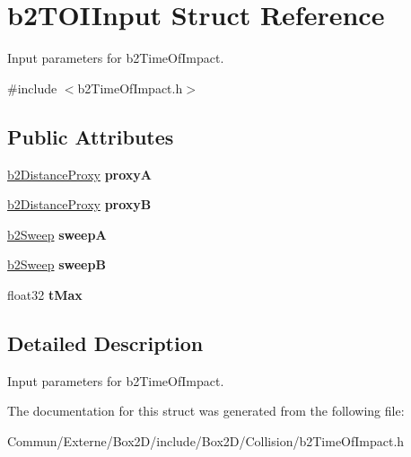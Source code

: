 \hypertarget{structb2_t_o_i_input}{}\section{b2\+T\+O\+I\+Input Struct Reference}
\label{structb2_t_o_i_input}


Input parameters for b2\+Time\+Of\+Impact.  




{\ttfamily \#include $<$b2\+Time\+Of\+Impact.\+h$>$}

\subsection*{Public Attributes}
\begin{DoxyCompactItemize}
\item 
\hyperlink{structb2_distance_proxy}{b2\+Distance\+Proxy} {\bfseries proxyA}\hypertarget{structb2_t_o_i_input_a5c5fb931435d92ac2d2080552400cd57}{}\label{structb2_t_o_i_input_a5c5fb931435d92ac2d2080552400cd57}

\item 
\hyperlink{structb2_distance_proxy}{b2\+Distance\+Proxy} {\bfseries proxyB}\hypertarget{structb2_t_o_i_input_a7f4e614d1c574006402e9610c984a93f}{}\label{structb2_t_o_i_input_a7f4e614d1c574006402e9610c984a93f}

\item 
\hyperlink{structb2_sweep}{b2\+Sweep} {\bfseries sweepA}\hypertarget{structb2_t_o_i_input_adf63a4b9969aa839c2d520bf6d76148a}{}\label{structb2_t_o_i_input_adf63a4b9969aa839c2d520bf6d76148a}

\item 
\hyperlink{structb2_sweep}{b2\+Sweep} {\bfseries sweepB}\hypertarget{structb2_t_o_i_input_af506b6adc7eca852f08460ec76c7b9a7}{}\label{structb2_t_o_i_input_af506b6adc7eca852f08460ec76c7b9a7}

\item 
float32 {\bfseries t\+Max}\hypertarget{structb2_t_o_i_input_a365a434996de60957777a673918d3a5f}{}\label{structb2_t_o_i_input_a365a434996de60957777a673918d3a5f}

\end{DoxyCompactItemize}


\subsection{Detailed Description}
Input parameters for b2\+Time\+Of\+Impact. 

The documentation for this struct was generated from the following file\+:\begin{DoxyCompactItemize}
\item 
Commun/\+Externe/\+Box2\+D/include/\+Box2\+D/\+Collision/b2\+Time\+Of\+Impact.\+h\end{DoxyCompactItemize}
